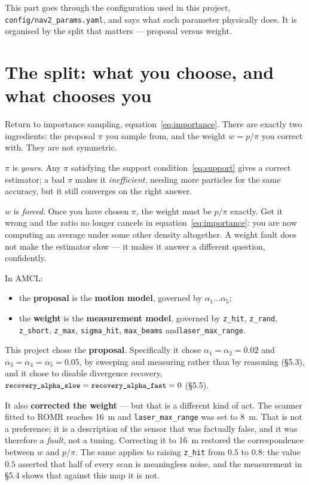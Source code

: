 \documentclass[11pt,a4paper]{report}
\newcommand{\term}[1]{\textcolor{rust}{\textbf{#1}}}
\newcommand{\file}[1]{\texttt{\small #1}}
\begin{document}
This part goes through the configuration used in this project,
\file{config/nav2\_params.yaml}, and says what each parameter physically does.
It is organised by the split that matters --- proposal versus weight.

\section{The split: what you choose, and what chooses you}

Return to importance sampling, equation~\eqref{eq:importance}. There are
exactly two ingredients: the proposal $\pi$ you sample from, and the weight
$w = p/\pi$ you correct with. They are not symmetric.

\begin{keyidea}
$\pi$ is \emph{yours}. Any $\pi$ satisfying the support
condition~\eqref{eq:support} gives a correct estimator; a bad $\pi$ makes it
\emph{inefficient}, needing more particles for the same accuracy, but it still
converges on the right answer.

$w$ is \emph{forced}. Once you have chosen $\pi$, the weight must be $p/\pi$
exactly. Get it wrong and the ratio no longer cancels in
equation~\eqref{eq:importance}: you are now computing an average under some
other density altogether. A weight fault does not make the estimator slow ---
it makes it answer a different question, confidently.
\end{keyidea}

In AMCL:
\begin{itemize}[leftmargin=1.4em,itemsep=2pt]
\item the \textbf{proposal} is the \term{motion model}, governed by
$\alpha_1 \ldots \alpha_5$;
\item the \textbf{weight} is the \term{measurement model}, governed by
\file{z\_hit}, \file{z\_rand}, \file{z\_short}, \file{z\_max},
\file{sigma\_hit}, \file{max\_beams} and\linebreak \file{laser\_max\_range}.
\end{itemize}

\begin{plain}
This project chose the \textbf{proposal}. Specifically it chose
$\alpha_1 = \alpha_2 = 0.02$ and $\alpha_3 = \alpha_4 = \alpha_5 = 0.05$, by
sweeping and measuring rather than by reasoning (\S5.3), and it chose to
disable divergence recovery, $\file{recovery\_alpha\_slow} =
\file{recovery\_alpha\_fast} = 0$ (\S5.5).

It also \textbf{corrected the weight} --- but that is a different kind of act.
The scanner fitted to ROMR reaches \SI{16}{\metre} and
\file{laser\_max\_range} was set to \SI{8}{\metre}. That is not a preference;
it is a description of the sensor that was factually false, and it was
therefore a \emph{fault}, not a tuning. Correcting it to \SI{16}{\metre}
restored the correspondence between $w$ and $p/\pi$. The same applies to
raising \file{z\_hit} from $0.5$ to $0.8$: the value $0.5$ asserted that half
of every scan is meaningless noise, and the measurement in \S5.4 shows that
against this map it is not.
\end{plain}
\end{document}
